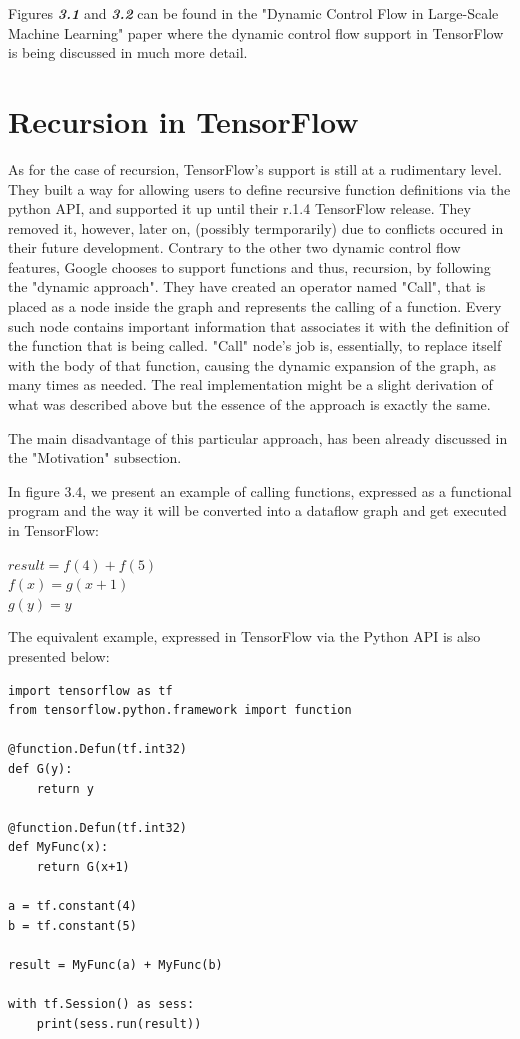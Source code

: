 \documentclass[ack,preface]{dithesis}
\begin{document}
Figures \textit{\textbf{3.1}} and \textit{\textbf{3.2}}  can be found in the "Dynamic Control Flow in Large-Scale Machine Learning" paper  \cite{Yu:2018} where the dynamic control flow support in TensorFlow is being discussed in much more detail.

\section{Recursion in TensorFlow}
As for the case of recursion, TensorFlow's support is still at a rudimentary level. They built a way for allowing users to define recursive function definitions via the python API,  and supported it up until their r.1.4 TensorFlow release. They removed it, however, later on, (possibly termporarily) due to conflicts occured in their future development. Contrary to the other two dynamic control flow features, Google chooses to support functions and thus, recursion, by following the "dynamic approach".  They have created an operator named "Call", that is placed as a node inside the graph and represents the calling of a function. Every such node contains important information that associates it with the definition  of the function that is being called.  "Call" node's job is, essentially,  to replace itself with the body of that function, causing the dynamic expansion of the graph, as many times as needed. The real implementation might be a slight derivation of what was described above but the essence of the approach is exactly the same.

The main disadvantage of this particular approach, has been already discussed in the "Motivation" subsection.

\begin{flushleft}
  In figure 3.4, we present an example of calling functions, expressed as a functional program and the way it will be converted into a dataflow graph and get executed in TensorFlow:

 \setlength{\parindent}{25ex} $result = f(4) + f(5)$ \\
$f(x) = g(x+1)$ \\ 
$g(y) = y$
\end{flushleft}

The equivalent example, expressed in TensorFlow via the Python API is also presented below:

\begin{lstlisting}
import tensorflow as tf
from tensorflow.python.framework import function

@function.Defun(tf.int32)
def G(y):
	return y

@function.Defun(tf.int32)
def MyFunc(x):
	return G(x+1)

a = tf.constant(4)
b = tf.constant(5)

result = MyFunc(a) + MyFunc(b)

with tf.Session() as sess:
	print(sess.run(result))
\end{lstlisting}
\end{document}
